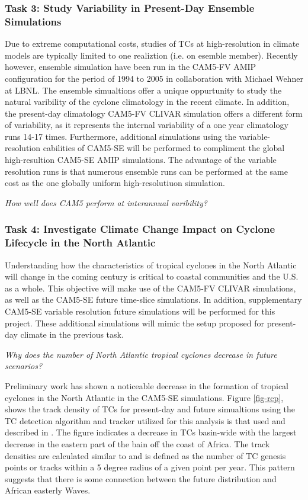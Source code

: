 \documentclass[11pt]{article}
\begin{document}
\subsubsection{Task 3: Study Variability in Present-Day Ensemble Simulations}
Due to extreme computational costs, studies of TCs at high-resolution in climate models are typically limited to one realiztion (i.e. on esemble member). Recently however, ensemble simulation have been run in the CAM5-FV AMIP configuration for the period of 1994 to 2005 in collaboration with Michael Wehner at LBNL. The ensemble simualtions offer a unique oppurtunity to study the natural varibility of the cyclone climatology in the recent climate. In addition, the present-day climatology CAM5-FV CLIVAR simulation offers a different form of variability, as it represents the internal variability of a one year climatology runs 14-17 times. Furthermore, additional simulations using the variable-resolution cabilities of CAM5-SE will be performed to compliment the global high-resultion CAM5-SE AMIP simulations. The advantage of the variable resolution runs is that numerous ensemble runs can be performed at the same cost as the one globally uniform high-resolutiuon simulation.

\emph{How well does CAM5 perform at interannual varibility?}


\subsubsection{Task 4: Investigate Climate Change Impact on Cyclone Lifecycle in the North Atlantic}
Understanding how the characteristics of tropical cyclones in the North Atlantic will change in the coming century is critical to coastal communities and the U.S. as a whole. This objective will make use of the CAM5-FV CLIVAR simulations, as well as the CAM5-SE future time-slice simulations. In addition, supplementary CAM5-SE variable resolution future simulations will be performed for this project. These additional simulations will mimic the setup proposed for present-day climate in the previous task. 

\emph{Why does the number of North Atlantic tropical cyclones decrease in future scenarios?}

Preliminary work has shown a noticeable decrease in the formation of tropical cyclones in the North Atlantic in the CAM5-SE simulations. Figure \ref{fig-rcp}, shows the track density of TCs for present-day and future simualtions using the TC detection algorithm and tracker utilized for this analysis is that used and described in \citet{Zhao2009}. The figure indicates a decrease in TCs basin-wide with the largest decrease in the eastern part of the bain off the coast of Africa. The track densities are calculated similar to \citet{Done2013} and is defined as the number of TC genesis points or tracks within a 5 degree radius of a given point per year. This pattern suggests that there is some connection between the future distribution and African easterly Waves.
\end{document}
